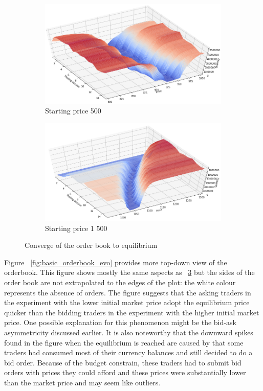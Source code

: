 \begin{figure}[H]
    \centering
    \begin{subfigure}{.5\textwidth}
      \centering
      \includegraphics[width=\linewidth]{plots/basic_market_depth_converge_lower.png}
      \caption{Starting price 500}
      \label{fig:market_depth_lower}
    \end{subfigure}%
    \begin{subfigure}{.5\textwidth}
      \centering
      \includegraphics[width=\linewidth]{plots/basic_market_depth_converge_higher.png}
      \caption{Starting price 1 500}
      \label{fig:market_depth_higher}
    \end{subfigure}
    \caption{Converge of the order book to equilibrium}
    \label{fig:market_depths}
\end{figure}

Figure ~\ref{fig:basic_orderbook_evo} provides more top-down view of the orderbook.
This figure shows mostly the same aspects as ~\ref{fig:market_depths} but the sides of the 
order book are not extrapolated to the edges of the plot: the white colour represents the absence of orders.
The figure suggests that the asking traders in the experiment with the lower initial market price
adopt the equilibrium price quicker than the bidding traders in the experiment with the higher initial market 
price. One possible explanation for this phenomenon might be the bid-ask asymmetricity
discussed earlier. It is also noteworthy that the downward spikes found in the figure when the equilibrium
is reached are caused by that some traders had consumed most of their currency balances and still decided 
to do a bid order. Because of the budget constrain, these traders had to submit bid orders with prices
they could afford and these prices were substantially lower than the market price and may seem like outliers.

